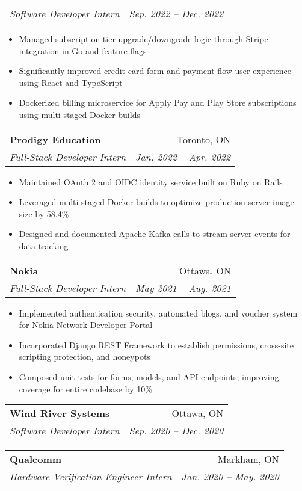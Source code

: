\documentclass[letterpaper,11pt]{article}
\makeatletter
\newcommand{\resumeItem}[1]{
  \item\small{
    {#1 \vspace{-2pt}}
  }
}
\newcommand{\resumeSubheading}[4]{
  \vspace{-2pt}\item
    \begin{tabular*}{0.97\textwidth}[t]{l@{\extracolsep{\fill}}r}
      \textbf{#1} & #2 \\
      \textit{\small#3} & \textit{\small #4} \\
    \end{tabular*}\vspace{-7pt}
}
\newcommand{\resumeSubSubheading}[2]{
    \item
    \begin{tabular*}{0.97\textwidth}{l@{\extracolsep{\fill}}r}
      \textit{\small#1} & \textit{\small #2} \\
    \end{tabular*}\vspace{-7pt}
}
\newcommand{\resumeItemListStart}{\begin{itemize}}
\newcommand{\resumeItemListEnd}{\end{itemize}\vspace{-5pt}}
\makeatother
\begin{document}
    \resumeSubSubheading
      {Software Developer Intern}{Sep. 2022 -- Dec. 2022}
      \resumeItemListStart
        \resumeItem{Managed subscription tier upgrade/downgrade logic through Stripe integration in Go and feature flags}
        \resumeItem{Significantly improved credit card form and payment flow user experience using React and TypeScript}
        \resumeItem{Dockerized billing microservice for Apply Pay and Play Store subscriptions using multi-staged Docker builds}
      \resumeItemListEnd

    \resumeSubheading
      {Prodigy Education}{Toronto, ON}
      {Full-Stack Developer Intern}{Jan. 2022 -- Apr. 2022}
      \resumeItemListStart
        \resumeItem{Maintained OAuth 2 and OIDC identity service built on Ruby on Rails}
        \resumeItem{Leveraged multi-staged Docker builds to optimize production server image size by 58.4\%}
        \resumeItem{Designed and documented Apache Kafka calls to stream server events for data tracking}
      \resumeItemListEnd

    \resumeSubheading
      {Nokia}{Ottawa, ON}
      {Full-Stack Developer Intern}{May 2021 -- Aug. 2021}
      \resumeItemListStart
        \resumeItem{Implemented authentication security, automated blogs, and voucher system for Nokia Network Developer Portal}
        \resumeItem{Incorporated Django REST Framework to establish permissions, cross-site scripting protection, and honeypots}
        \resumeItem{Composed unit tests for forms, models, and API endpoints, improving coverage for entire codebase by 10\%}
      \resumeItemListEnd

    \resumeSubheading
      {Wind River Systems}{Ottawa, ON}
      {Software Developer Intern}{Sep. 2020 -- Dec. 2020}

    \vspace{2pt}
    \resumeSubheading
      {Qualcomm}{Markham, ON}
      {Hardware Verification Engineer Intern}{Jan. 2020 -- May. 2020}
\end{document}

